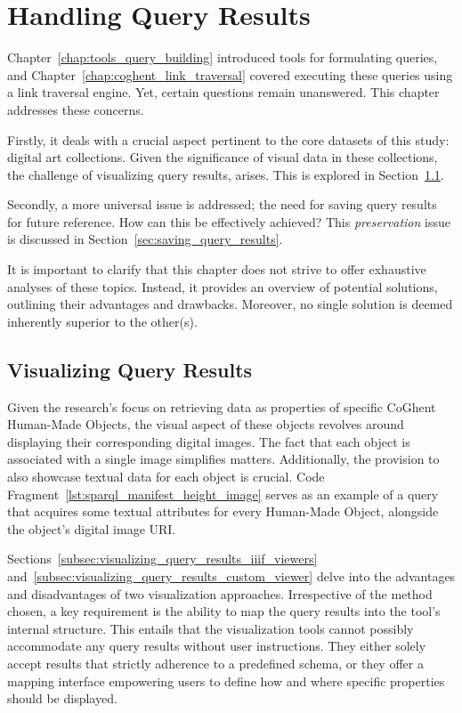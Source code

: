 \chapter{Handling Query Results}
\label{chap:handling_query_results}

Chapter~\ref{chap:tools_query_building} introduced tools for formulating queries, and Chapter~\ref{chap:coghent_link_traversal} covered executing these queries using a link traversal engine. Yet, certain questions remain unanswered. This chapter addresses these concerns.

Firstly, it deals with a crucial aspect pertinent to the core datasets of this study: digital art collections. Given the significance of visual data in these collections, the challenge of visualizing query results, arises. This is explored in Section~\ref{sec:visualizing_query_results}.

Secondly, a more universal issue is addressed; the need for saving query results for future reference. How can this be effectively achieved? This \textit{preservation} issue is discussed in Section~\ref{sec:saving_query_results}.

It is important to clarify that this chapter does not strive to offer exhaustive analyses of these topics. Instead, it provides an overview of potential solutions, outlining their advantages and drawbacks. Moreover, no single solution is deemed inherently superior to the other(s).

\section{Visualizing Query Results}
\label{sec:visualizing_query_results}

Given the research's focus on retrieving data as properties of specific CoGhent Human-Made Objects, the visual aspect of these objects revolves around displaying their corresponding digital images. The fact that each object is associated with a single image simplifies matters. Additionally, the provision to also showcase textual data for each object is crucial. Code Fragment~\ref{lst:sparql_manifest_height_image} serves as an example of a query that acquires some textual attributes for every Human-Made Object, alongside the object's digital image URI.

Sections~\ref{subsec:visualizing_query_results_iiif_viewers} and~\ref{subsec:visualizing_query_results_custom_viewer} delve into the advantages and disadvantages of two visualization approaches. Irrespective of the method chosen, a key requirement is the ability to map the query results into the tool's internal structure. This entails that the visualization tools cannot possibly accommodate any query results without user instructions. They either solely accept results that strictly adherence to a predefined schema, or they offer a mapping interface empowering users to define how and where specific properties should be displayed.

